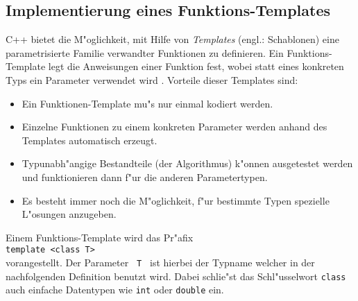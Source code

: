 \subsection{Implementierung eines Funktions-Templates}
\label{p:10.1.1}
C++ bietet die M"oglichkeit, mit Hilfe von \emph{Templates} (engl.: Schablonen)
eine parametrisierte Familie verwandter Funktionen zu definieren.
Ein Funktions-Template legt die Anweisungen
einer Funktion fest, wobei statt eines konkreten Typs ein Parameter verwendet wird
\cite[p.365]{KirchPrinz:2002:OOP}.
Vorteile dieser Templates sind:
\begin{itemize}
 \item Ein Funktionen-Template mu"s nur einmal kodiert werden.
 \item Einzelne Funktionen zu einem konkreten Parameter werden anhand des Templates
 	automatisch erzeugt.
 \item Typunabh"angige Bestandteile (der Algorithmus) k"onnen ausgetestet werden und
 	funktionieren dann f"ur die anderen Parametertypen.
 \item Es besteht immer noch die M"oglichkeit, f"ur bestimmte Typen spezielle L"osungen
 	anzugeben.
\end{itemize}

Einem Funktions-Template wird das Pr"afix
\\[0.5ex]
\verb|template <class T>|
\\[0.5ex]
vorangestellt. Der Parameter \verb| T | ist hierbei der Typname welcher in der nachfolgenden
Definition benutzt wird.
Dabei schlie"st das Schl"usselwort \verb|class| auch einfache Datentypen wie
\verb|int| oder \verb|double| ein.

